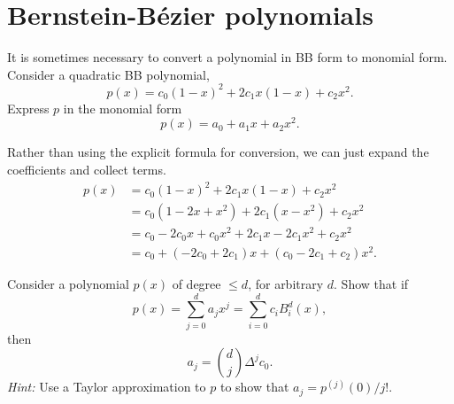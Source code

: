 \section{Bernstein-Bézier polynomials}

\begin{exercise}
    It is sometimes necessary to convert a polynomial in BB form to monomial form.
    Consider a quadratic BB polynomial,
    \begin{equation*}
        p(x) = c_0 (1 - x)^2 + 2c_1 x(1 - x) + c_2 x^2.
    \end{equation*}
    Express $p$ in the monomial form
    \begin{equation*}
        p(x) = a_0 + a_1 x + a_2 x^2.
    \end{equation*}
\end{exercise}

\begin{solution}
    Rather than using the explicit formula for conversion, we can just expand the coefficients and collect terms.
    \begin{align*}
        p(x) &= c_0 (1 - x)^2 + 2c_1 x(1 - x) + c_2 x^2 \\
        &= c_0 (1 - 2x + x^2) + 2c_1 (x - x^2) + c_2 x^2 \\
        &= c_0 - 2c_0 x + c_0 x^2 + 2c_1 x - 2c_1 x^2 + c_2 x^2 \\
        &= c_0 + (-2c_0 + 2c_1) x + (c_0 - 2c_1 + c_2) x^2.
    \end{align*}
\end{solution}

\begin{exercise}
    Consider a polynomial $p(x)$ of degree $\leq d$, for arbitrary $d$.
    Show that if
    \begin{equation*}
        p(x) = \sum_{j=0}^d a_j x^j = \sum_{i=0}^d c_i B_i^d(x),
    \end{equation*}
    then
    \begin{equation*}
        a_j = \binom{d}{j} \Delta^j c_0.
    \end{equation*}
    \textit{Hint:} Use a Taylor approximation to $p$ to show that $a_j = p^{(j)}(0)/j!$. %
\end{exercise}

